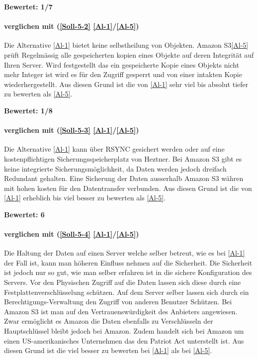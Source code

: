 \textbf{Bewertet: 1/7}


\paragraph*{  verglichen mit  (\ref{Soll-5-2} \ref{Al-1}/\ref{Al-5})} 
Die Alternative \ref{Al-1} bietet keine selbstheilung von Objekten. Amazon S3\ref{Al-5} prüft Regelmässig alle gespeicherten kopien eines Objekte auf deren Integrität auf Ihren Server. Wird festgestellt das ein gespeicherte Kopie eines Objekts nicht mehr Integer ist wird es für den Zugriff gesperrt und von einer intakten Kopie wiederhergestellt. Aus diesen Grund ist die  von \ref{Al-1} sehr viel bis absolut tiefer zu bewerten als \ref{Al-5}.

\textbf{Bewertet: 1/8}

\paragraph*{  verglichen mit  (\ref{Soll-5-3} \ref{Al-1}/\ref{Al-5})} 
Die Alternative \ref{Al-1} kann über RSYNC gesichert werden oder auf eine kostenpflichtigen Sicherungsspeicherplatz von Heztner. Bei Amazon S3 gibt es keine integrierte Sicherungsmöglichkeit, da Daten werden jedoch dreifach Redundant gehalten. Eine Sicherung der Daten ausserhalb Amazon S3 währen mit hohen kosten für den Datentransfer verbunden. Aus diesen Grund ist die  von \ref{Al-1} erheblich bis viel besser zu bewerten als \ref{Al-5}.

\textbf{Bewertet: 6}

\paragraph*{  verglichen mit  (\ref{Soll-5-4} \ref{Al-1}/\ref{Al-5})} 
Die Haltung der Daten auf einen Server welche selber betreut, wie es bei \ref{Al-1} der Fall ist, kann man höheren Einfluss nehmen auf die Sicherheit. Die Sicherheit ist jedoch nur so gut, wie man selber erfahren ist in die sichere Konfiguration des Servers. Vor den Physischen Zugriff auf die Daten lassen sich diese durch eine Festplattenverschlüsselung schützen. Auf dem Server selber lassen sich durch ein Berechtigungs-Verwaltung den Zugriff von anderen Benutzer Schützen. Bei Amazon S3 ist man auf den Vertrauenswürdigkeit des Anbieters angewiesen. Zwar ermöglicht es Amazon die Daten ebenfalls zu Verschlüsseln der Hauptschlüssel bleibt jedoch bei Amazon. Zudem handelt sich bei Amazon um einen US-amerikanisches Unternehmen das den Patriot Act unterstellt ist.
Aus diesen Grund ist die  viel besser zu bewerten bei \ref{Al-1} als bei \ref{Al-5}.

